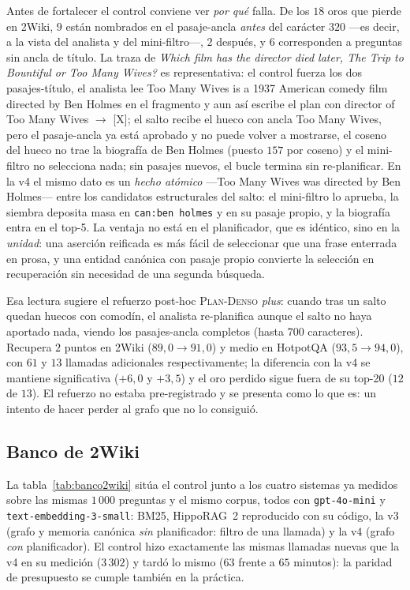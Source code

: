 \documentclass[11pt,a4paper]{article}
\newcommand{\hippo}{HippoRAG~2}
\newcommand{\gl}{\guillemotleft}
\newcommand{\gr}{\guillemotright}
\newcommand{\ctrl}{\textsc{Plan-Denso}}
\begin{document}
Antes de fortalecer el control conviene ver \emph{por qué} falla. De los
$18$ oros que pierde en 2Wiki, $9$ están nombrados en el pasaje-ancla
\emph{antes} del carácter $320$ ---es decir, a la vista del analista y del
mini-filtro---, $2$ después, y $6$ corresponden a preguntas sin ancla de
título. La traza de \gl{}\emph{Which film has the director died later, The
Trip to Bountiful or Too Many Wives?}\gr{} es representativa: el control
fuerza los dos pasajes-título, el analista lee \gl{}Too Many Wives is a 1937
American comedy film directed by Ben Holmes\gr{} en el fragmento y aun así
escribe el plan con \gl{}director of Too Many Wives $\to$ [X]\gr{}; el salto
recibe el hueco con ancla \gl{}Too Many Wives\gr{}, pero el pasaje-ancla ya
está aprobado y no puede volver a mostrarse, el coseno del hueco no trae
la biografía de Ben Holmes (puesto $157$ por coseno) y el mini-filtro no
selecciona nada; sin pasajes nuevos, el bucle termina sin re-planificar.
En la v4 el mismo dato es un \emph{hecho atómico} ---\gl{}Too Many Wives
was directed by Ben Holmes\gr{}--- entre los candidatos estructurales del
salto: el mini-filtro lo aprueba, la siembra deposita masa en
\texttt{can:ben holmes} y en su pasaje propio, y la biografía entra en el
top-5. La ventaja no está en el planificador, que es idéntico, sino en la
\emph{unidad}: una aserción reificada es más fácil de seleccionar que una
frase enterrada en prosa, y una entidad canónica con pasaje propio convierte
la selección en recuperación sin necesidad de una segunda búsqueda.

Esa lectura sugiere el refuerzo post-hoc \ctrl{} \emph{plus}: cuando tras un
salto quedan huecos con comodín, el analista re-planifica aunque el salto no
haya aportado nada, viendo los pasajes-ancla completos (hasta $700$
caracteres). Recupera $2$ puntos en 2Wiki ($89{,}0 \to 91{,}0$) y medio en
HotpotQA ($93{,}5 \to 94{,}0$), con $61$ y $13$ llamadas adicionales
respectivamente; la diferencia con la v4 se mantiene significativa
($+6{,}0$ y $+3{,}5$) y el oro perdido sigue fuera de su top-20 ($12$ de
$13$). El refuerzo no estaba pre-registrado y se presenta como lo que es:
un intento de hacer perder al grafo que no lo consiguió.

\subsection{Banco de 2Wiki}
\label{sec:banco2wiki}

La tabla~\ref{tab:banco2wiki} sitúa el control junto a los cuatro sistemas
ya medidos sobre las mismas $1\,000$ preguntas y el mismo corpus, todos con
\texttt{gpt-4o-mini} y \texttt{text-embedding-3-small}: BM25, \hippo{}
reproducido con su código, la v3 (grafo y memoria canónica \emph{sin}
planificador: filtro de una llamada) y la v4 (grafo \emph{con}
planificador). El control hizo exactamente las mismas llamadas nuevas que
la v4 en su medición ($3\,302$) y tardó lo mismo ($63$ frente a $65$
minutos): la paridad de presupuesto se cumple también en la práctica.
\end{document}
